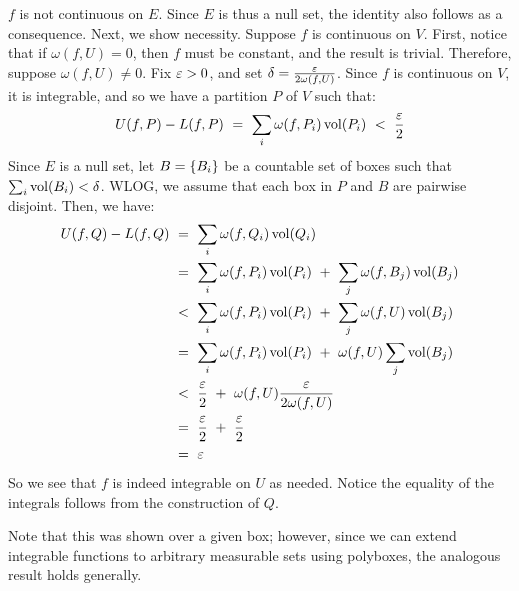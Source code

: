 \begin{pf}
    $ f $ is not continuous on $ E $. Since $ E $ is thus a null set, the
    identity also follows as a consequence.
    \vsp
    Next, we show necessity. Suppose $ f $ is continuous on $ V $. First, notice
    that if $ \omega(f, U) = 0 $, then $ f $ must be constant, and the result is
    trivial. Therefore, suppose $ \omega(f, U) \neq 0 $. Fix $ \operatorname{\varepsilon} > 0 $, and
    set $ \delta = \frac{\operatorname{\varepsilon}}{2\omega(f,U)} $. \vsp
    Since $ f $ is continuous on $ V $, it is integrable, and so we have a
    partition $ P $ of $ V $ such that:
    \begin{equation*}
        U(f,P) - L(f,P) \ = \ \sum_{i}\omega(f,P_{i})\vol(P_{i})
        \ < \ \frac{\ep}{2}
    \end{equation*}
    Since $ E $ is a null set, let $ B = \left\{{B_{i}}\right\} $ be a countable set of
    boxes such that $ \sum_{i}\operatorname{vol}(B_{i}) < \delta $. WLOG, we assume that each
    box in $ P $ and $ B $ are pairwise disjoint. Then, we have:
    \begin{align*}
        U(f,Q) - L(f,Q) & \ = \ \sum_{i}\omega(f,Q_{i})\vol(Q_{i}) \\
        & \ = \ \sum_{i}\omega(f,P_{i})\vol(P_{i})
            \ + \  \sum_{j}\omega(f,B_{j})\vol(B_{j}) \\
        & \ < \ \sum_{i}\omega(f,P_{i})\vol(P_{i})
            \ + \  \sum_{j}\omega(f,U)\vol(B_{j}) \\
        & \ = \ \sum_{i}\omega(f,P_{i})\vol(P_{i})
            \ + \  \omega(f,U)\sum_{j}\vol(B_{j}) \\
        & \ < \ \frac{\ep}{2} \ + \ \omega(f,U)\frac{\ep}{2\omega(f,U)} \\
        & \ = \ \frac{\ep}{2} \ + \ \frac{\ep}{2} \\
        & \ = \ \ep
    \end{align*}
    So we see that $ f $ is indeed integrable on $ U $ as needed.
    Notice the equality of the integrals follows from the construction of $ Q $.
\end{pf}

Note that this was shown over a given box; however, since we can extend
integrable functions to arbitrary measurable sets using polyboxes, the analogous
result holds generally.
